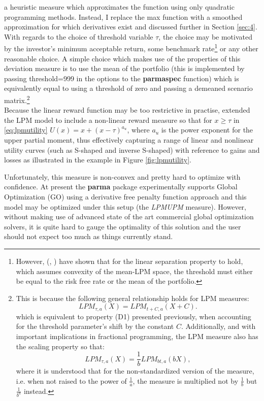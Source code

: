 a heuristic measure which approximates the function using only quadratic
programming methods. Instead, I replace the max function with a smoothed
approximation for which derivatives exist and discussed further in Section
\ref{sec:4}. With regards to the choice of threshold variable $\tau$, the
choice may be motivated by the investor's minimum acceptable return, some
benchmark rate\footnote{However, 
(\citeyear*{Brogan2005}, \citeyear*{Brogan2008}) have shown that for the
linear separation property to hold, which assumes convexity of the mean-LPM
space, the threshold must either be equal to the risk free rate or the mean
of the portfolio.} or any other reasonable choice. A simple choice which
makes use of the properties of this deviation measure is to use the mean of
the portfolio (this is implemented by passing threshold=999 in the options
to the \textbf{parmaspec} function) which is equivalently equal to using a
threshold of zero and passing a demeaned scenario matrix.\footnote{This is
because the following general relationship holds for LPM measures:
\begin{equation}\label{eq:lpmscaling1}
LP{M_{\tau ,a}}\left( X \right)=LP{M_{t + C,a}}\left( {X + C} \right).
\end{equation}
which is equivalent to property (D1) presented previously, when accounting
for the threshold parameter's shift by the constant $C$. Additionally, and
with important implications in fractional programming, the LPM measure also
has the scaling property so that:
\begin{equation}\label{eq:lpmscaling2}
LP{M_{\tau ,a}}\left( X \right)=\frac{1}{b}LP{M_{bt,a}}\left( {bX} \right),
\end{equation}
where it is understood that for the non-standardized version of the measure,
i.e. when not raised to the power of $\frac{1}{a}$, the measure is multiplied
not
by $\frac{1}{b}$ but $\frac{1}{b^a}$ instead.}\\
Because the linear reward function may be too restrictive in practise,
 extended the LPM model to include a non-linear
reward measure so that for $x\geq\tau$ in \eqref{eq:lpmutility}
$U\left(x\right)=x + {\left( {x - \tau } \right)^{{a_u}}}$, where $a_u$ is
the power exponent for the upper partial moment, thus effectively capturing a
range of linear and nonlinear utility curves (such as S-shaped and inverse
S-shaped) with reference to gains and losses as illustrated in the example in
Figure \ref{fig:lpmutility}.

Unfortunately, this measure is non-convex and pretty hard to optimize with
confidence. At present the \textbf{parma} package experimentally supports
Global Optimization (GO) using a derivative free penalty function approach
and this model may be optimized under this setup (the \emph{LPMUPM} measure).
However, without making use of advanced state of the art commercial global
optimization solvers, it is quite hard to gauge the optimality of this solution
and the user should not expect too much as things currently stand.
